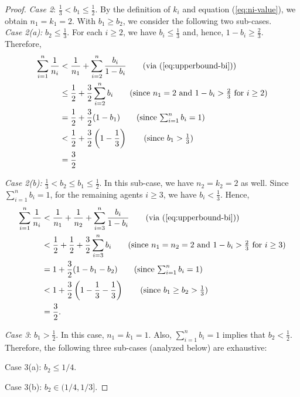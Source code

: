 \begin{proof}
\noindent\emph{Case 2}: $\frac{1}{3} < b_1 \leq \frac{1}{2}$. By the definition of $k_i$ and equation (\ref{eq:ni-value}), we obtain $n_1= k_1 = 2$. With $b_1\geq b_2$, we consider the following two sub-cases. \\

    \noindent
    \emph{Case 2(a):} $b_2 \leq \frac{1}{3}$.  For each $i \geq 2$, we have $b_i\leq \frac{1}{3}$ and, hence, $1 - b_i \geq \frac{2}{3}$. Therefore, 
    \begin{align*}
    \sum_{i=1}^n\frac{1}{n_i} 
    & < \frac{1}{n_1} + \sum_{i=2}^n \frac{b_i}{1-b_i} \tag{via (\ref{eq:upperbound-bi})} \\ 
    & \leq \frac{1}{2} + \frac{3}{2} \sum_{i=2}^n b_i \tag{since $n_1 = 2$ and $1 - b_i> \frac{2}{3}$ for $i\geq 2$} \\
    & = \frac{1}{2} + \frac{3}{2}(1-b_1)   \tag{since $\sum_{i=1}^n b_i = 1$}\\
    & <  \frac{1}{2} + \frac{3}{2}\left(1-\frac{1}{3}\right) \tag{since $b_1>\frac{1}{3}$}\\
    &= \frac{3}{2}
    \end{align*}

    \noindent
    \emph{Case 2(b):} $\frac{1}{3} < b_2 \leq b_1 \leq \frac{1}{2}$. In this sub-case, we have $n_2 = k_2 = 2$ as well. Since $\sum_{i=1}^n b_i = 1$, for the remaining agents $i \geq 3$, we have $b_i < \frac{1}{3}$. Hence,
    \begin{align*}
    \sum_{i=1}^n\frac{1}{n_i} 
    &<  \frac{1}{n_1} + \frac{1}{n_2} + \sum_{i=3}^n \frac{b_i}{1-b_i} \tag{via (\ref{eq:upperbound-bi})} \\ 
    & < \frac{1}{2}+\frac{1}{2} + \frac{3}{2} \sum_{i=3}^n b_i \tag{since $n_1 = n_2 = 2$ and $1 - b_i> \frac{2}{3}$ for $i\geq 3$} \\
    & = 1 + \frac{3}{2}(1-b_1-b_2)  \tag{since $\sum_{i=1}^n b_i = 1$}\\
    & <  1 + \frac{3}{2} \left(1-\frac{1}{3}-\frac{1}{3}\right) \tag{since $b_1\geq b_2 > \frac{1}{3}$} \\
    &= \frac{3}{2}.
    \end{align*}

\noindent\emph{Case 3}: $b_1> \frac{1}{2}$. In this case, $n_1 = k_1 = 1$. Also, $\sum_{i=1}^n b_i=1$ implies that $b_2 < \frac{1}{2}$. Therefore, the following three sub-cases (analyzed below) are exhaustive: 

\noindent
Case 3(a): $b_2 \leq 1/4$. 

\noindent
Case 3(b): $b_2 \in (1/4, 1/3]$. 


\end{proof}

